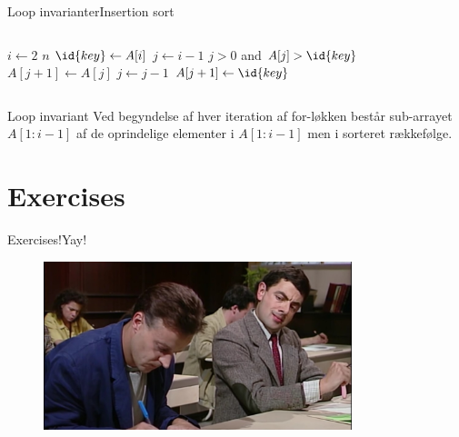 \documentclass[aspectratio=1610]{beamer}
\begin{document}
\begin{frame}[fragile]{Loop invarianter}{Insertion sort}
\begin{columns}

        \begin{minipage}{\textwidth}%
            \small

            \vspace{-\abovedisplayskip}
            \begin{codebox}
                \li \For $i \gets 2$ \To $n$ \Do
                    \li $\id{key} \gets A[i]$
                    \li $j \gets i - 1$
                    \li \While $j > 0$ and $A[j] > \id{key}$ \Do
                        \li $A[j+1] \gets A[j]$
                        \li $j \gets j - 1$
                    \End
                    \li $A[j+1] \gets \id{key}$
                \End
            \end{codebox}
            
        \end{minipage}

    \end{columns}

    \begin{block}{Loop invariant}
        Ved begyndelse af hver iteration af \alert{for-løkken} består
        sub-arrayet $A[1:i-1]$ af de oprindelige elementer i $A[1:i-1]$ men i
        sorteret rækkefølge.
    \end{block}

\end{frame}

\section{Exercises}

\begin{frame}{Exercises!}{Yay!}
    
    \begin{figure}[h]
        \centering
        \includegraphics[width=0.8\textwidth]{exercises}
    \end{figure}
    
\end{frame}
\end{document}
